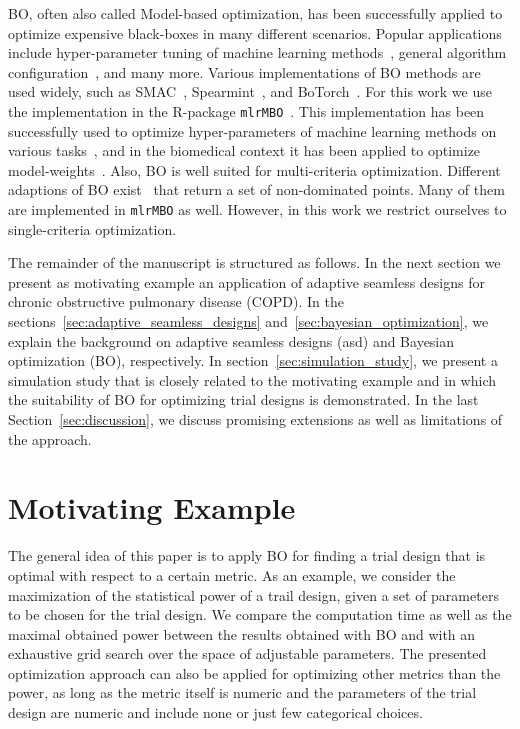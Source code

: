 \documentclass[bimj,fleqn]{w-art}
\theoremstyle{plain}
\theoremstyle{definition}
\begin{document}
BO, often also called Model-based optimization, has been successfully applied to optimize expensive black-boxes in many different scenarios.
Popular applications include hyper-parameter tuning of machine learning methods~\citep{snoek_practical_2012}, general algorithm configuration~\citep{hutter_sequential_2011}, and many more.
Various implementations of BO methods are used widely, such as SMAC~\citep{hutter_sequential_2011}, Spearmint~\citep{snoek_practical_2012}, and BoTorch~\citep{balandat_botorch_2020}.
For this work we use the implementation in the R-package \texttt{mlrMBO}~\citep{bischl_mlrmbo_2017}.
This implementation has been successfully used to optimize hyper-parameters of machine learning methods on various tasks~\citep{bischl_mlrmbo_2017, wozniak_candle_2018}, and in the biomedical context it has been applied to optimize model-weights~\citep{richter_modelbased_2019,browaeys_nichenet_2020}.
Also, BO is well suited for multi-criteria optimization.
Different adaptions of BO exist~\citep{horn_modelbased_2015} that return a set of non-dominated points.
Many of them are implemented in \texttt{mlrMBO} as well.
However, in this work we restrict ourselves to single-criteria optimization. 

The remainder of the manuscript is structured as follows.
In the next section we present as motivating example an application of adaptive seamless designs for chronic obstructive pulmonary disease (COPD).
In the sections~\ref{sec:adaptive_seamless_designs} and~\ref{sec:bayesian_optimization}, we explain the background on adaptive seamless designs (asd) and Bayesian optimization (BO), respectively.
In section~\ref{sec:simulation_study}, we present a simulation study that is closely related to the motivating example and in which the suitability of BO for optimizing trial designs is demonstrated.
In the last Section~\ref{sec:discussion}, we discuss promising extensions as well as limitations of the approach.

\section{Motivating Example}
\label{sec:motivating_example}

The general idea of this paper is to apply BO for finding a trial design that is optimal with respect to a certain metric.
As an example, we consider the maximization of the statistical power of a trail design, given a set of parameters to be chosen for the trial design.
We compare the computation time as well as the maximal obtained power between the results obtained with BO and with an exhaustive grid search over the space of adjustable parameters.
The presented optimization approach can also be applied for optimizing other metrics than the power, as long as the metric itself is numeric and the parameters of the trial design are numeric and include none or just few categorical choices.
\end{document}
